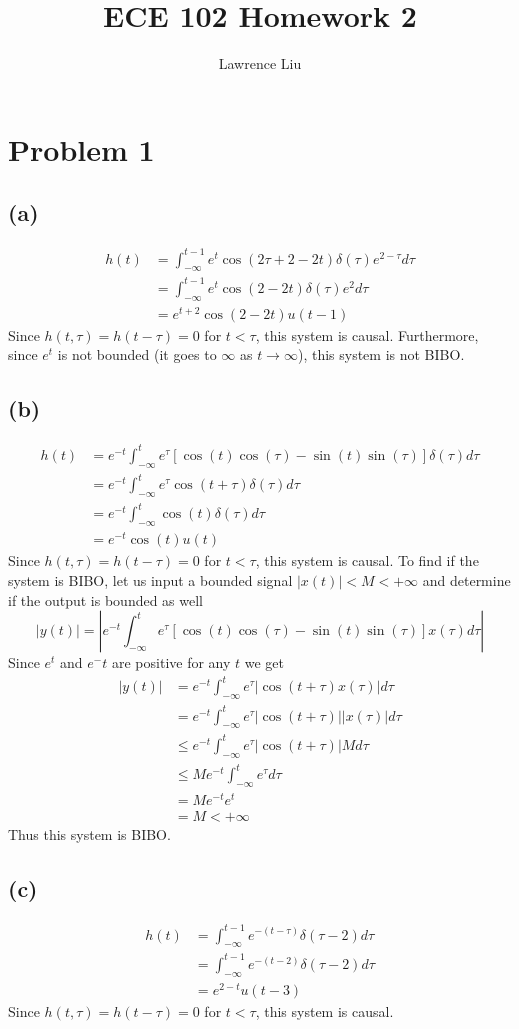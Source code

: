 \documentclass[12pt]{article}
\title{ECE 102 Homework 2}
\author{Lawrence Liu}
\begin{document}
\maketitle
\section*{Problem 1}
\subsection*{(a)}
\begin{align*}
h(t)&=\int_{-\infty}^{t-1}e^t\cos(2\tau+2-2t)\delta(\tau)e^{2-\tau}d\tau\\
&=\int_{-\infty}^{t-1}e^t\cos(2-2t)\delta(\tau)e^{2}d\tau\\
&=e^{t+2}\cos(2-2t)u(t-1)
\end{align*}
Since $h(t,\tau)=h(t-\tau)=0$ for $t<\tau$, this system is causal. Furthermore, since $e^t$ is not bounded (it goes to $\infty$ as $t\to\infty$), this system is not BIBO.
\subsection*{(b)}
\begin{align*}
h(t)&=e^{-t}\int_{-\infty}^{t}e^\tau[\cos(t)\cos(\tau)-\sin(t)\sin(\tau)]\delta(\tau)d\tau\\
&=e^{-t}\int_{-\infty}^{t}e^\tau\cos(t+\tau)\delta(\tau)d\tau\\
&=e^{-t}\int_{-\infty}^{t}\cos(t)\delta(\tau)d\tau\\
&=e^{-t}\cos(t)u(t)
\end{align*}
Since $h(t,\tau)=h(t-\tau)=0$ for $t<\tau$, this system is causal. To find if the system is BIBO, let us input a bounded signal $|x(t)|<M<+\infty$ and determine if the output is bounded as well
$$
|y(t)|=\left|e^{-t}\int_{-\infty}^{t}e^\tau[\cos(t)\cos(\tau)-\sin(t)\sin(\tau)]x(\tau)d\tau\right|
$$
Since $e^t$ and $e^-t$ are positive for any $t$ we get
\begin{align*}
|y(t)|&=e^{-t}\int_{-\infty}^{t}e^\tau|\cos(t+\tau)x(\tau)|d\tau\\
&=e^{-t}\int_{-\infty}^{t}e^\tau|\cos(t+\tau)||x(\tau)|d\tau\\
&\leq e^{-t}\int_{-\infty}^{t}e^\tau|\cos(t+\tau)|Md\tau\\
&\leq Me^{-t}\int_{-\infty}^{t}e^\tau d\tau\\
&=Me^{-t}e^t\\
&=M<+\infty
\end{align*}
Thus this system is BIBO.
\subsection*{(c)}
\begin{align*}
h(t)&=\int_{-\infty}^{t-1}e^{-(t-\tau)}\delta(\tau-2)d\tau\\
&=\int_{-\infty}^{t-1}e^{-(t-2)}\delta(\tau-2)d\tau\\
&=e^{2-t}u(t-3)
\end{align*}
Since $h(t,\tau)=h(t-\tau)=0$ for $t<\tau$, this system is causal.
\end{document}

